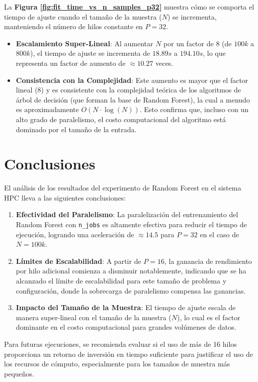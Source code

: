 \documentclass{article}
\begin{document}
La \textbf{Figura \ref{fig:fit_time_vs_n_samples_p32}} muestra cómo se comporta el tiempo de ajuste cuando el tamaño de la muestra ($N$) se incrementa, manteniendo el número de hilos constante en $P=32$.

\begin{itemize}
    \item \textbf{Escalamiento Super-Lineal}: Al aumentar $N$ por un factor de $8$ (de $100k$ a $800k$), el tiempo de ajuste se incrementa de $18.89s$ a $194.10s$, lo que representa un factor de aumento de $\approx 10.27$ veces.
    \item \textbf{Consistencia con la Complejidad}: Este aumento es mayor que el factor lineal ($8$) y es consistente con la complejidad teórica de los algoritmos de árbol de decisión (que forman la base de Random Forest), la cual a menudo es aproximadamente $O(N \cdot \log(N))$. Esto confirma que, incluso con un alto grado de paralelismo, el costo computacional del algoritmo está dominado por el tamaño de la entrada.
\end{itemize}

\section{Conclusiones}

El análisis de los resultados del experimento de Random Forest en el sistema HPC lleva a las siguientes conclusiones:

\begin{enumerate}
    \item \textbf{Efectividad del Paralelismo}: La paralelización del entrenamiento del Random Forest con \texttt{n\_jobs} es altamente efectiva para reducir el tiempo de ejecución, logrando una aceleración de $\approx 14.5$ para $P=32$ en el caso de $N=100k$.
    \item \textbf{Límites de Escalabilidad}: A partir de $P=16$, la ganancia de rendimiento por hilo adicional comienza a disminuir notablemente, indicando que se ha alcanzado el límite de escalabilidad para este tamaño de problema y configuración, donde la sobrecarga de paralelismo compensa las ganancias.
    \item \textbf{Impacto del Tamaño de la Muestra}: El tiempo de ajuste escala de manera super-lineal con el tamaño de la muestra ($N$), lo cual es el factor dominante en el costo computacional para grandes volúmenes de datos.
\end{enumerate}

Para futuras ejecuciones, se recomienda evaluar si el uso de más de 16 hilos proporciona un retorno de inversión en tiempo suficiente para justificar el uso de los recursos de cómputo, especialmente para los tamaños de muestra más pequeños.
\end{document}
